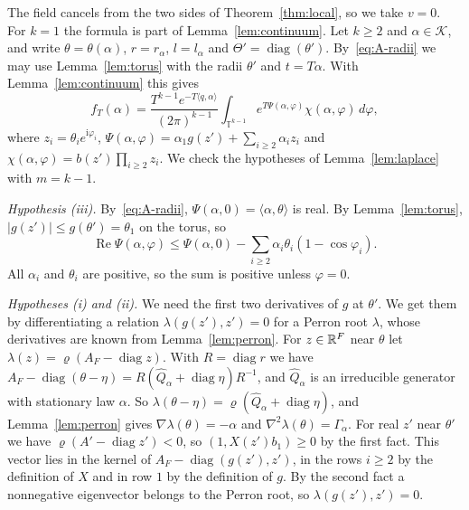 The field cancels from the two sides of Theorem~\ref{thm:local}, so we take $v=0$.
For $k=1$ the formula is part of Lemma~\ref{lem:continuum}. Let $k\ge2$ and
$\alpha\in\mathcal K$, and write $\theta=\theta(\alpha)$, $r=r_\alpha$,
$l=l_\alpha$ and $\Theta'=\operatorname{diag}(\theta')$. By~\eqref{eq:A-radii}
we may use Lemma~\ref{lem:torus} with the radii $\theta'$ and $t=T\alpha$.
With Lemma~\ref{lem:continuum} this gives
\begin{equation}\label{eq:A-fT}
f_T(\alpha)=\frac{T^{k-1}e^{-T\langle q,\alpha\rangle}}{(2\pi)^{k-1}}
\int_{\mathbb T^{k-1}}e^{T\Psi(\alpha,\varphi)}\chi(\alpha,\varphi)\,d\varphi,
\end{equation}
where $z_i=\theta_ie^{\mathrm i\varphi_i}$,
$\Psi(\alpha,\varphi)=\alpha_1g(z')+\sum_{i\ge2}\alpha_iz_i$ and
$\chi(\alpha,\varphi)=b(z')\prod_{i\ge2}z_i$. We check the hypotheses of
Lemma~\ref{lem:laplace} with $m=k-1$.

\emph{Hypothesis \textup{(iii)}.} By~\eqref{eq:A-radii},
$\Psi(\alpha,0)=\langle\alpha,\theta\rangle$ is real. By
Lemma~\ref{lem:torus}, $|g(z')|\le g(\theta')=\theta_1$ on the
torus, so
\[
\operatorname{Re}\Psi(\alpha,\varphi)\le\Psi(\alpha,0)
-\sum_{i\ge2}\alpha_i\theta_i(1-\cos\varphi_i).
\]
All $\alpha_i$ and $\theta_i$ are positive, so the sum is positive unless
$\varphi=0$.

\emph{Hypotheses \textup{(i)} and \textup{(ii)}.} We need the first two
derivatives of $g$ at $\theta'$. We get them by differentiating a relation
$\lambda(g(z'),z')=0$ for a Perron root $\lambda$, whose derivatives are
known from Lemma~\ref{lem:perron}. For $z\in\mathbb{R}^F$ near $\theta$ let
$\lambda(z)=\varrho(A_F-\operatorname{diag}z)$. With $R=\operatorname{diag}r$
we have $A_F-\operatorname{diag}(\theta-\eta)=R(\widehat
Q_\alpha+\operatorname{diag}\eta)R^{-1}$, and $\widehat Q_\alpha$ is an
irreducible generator with stationary law $\alpha$. So
$\lambda(\theta-\eta)=\varrho(\widehat Q_\alpha+\operatorname{diag}\eta)$, and
Lemma~\ref{lem:perron} gives $\nabla\lambda(\theta)=-\alpha$ and
$\nabla^2\lambda(\theta)=\Gamma_\alpha$. For real $z'$ near $\theta'$ we have
$\varrho(A'-\operatorname{diag}z')<0$, so $(1,X(z')b_1)\ge0$ by the first
fact. This vector lies in the kernel of $A_F-\operatorname{diag}(g(z'),z')$, in
the rows $i\ge2$ by the definition of $X$ and in row $1$ by the definition of
$g$. By the second fact a nonnegative eigenvector belongs to the Perron
root, so $\lambda(g(z'),z')=0$.

